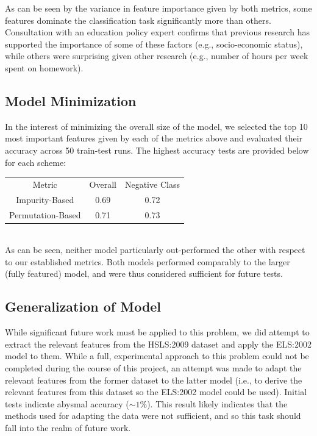 \documentclass[conference]{IEEEtran}
\begin{document}
As can be seen by the variance in feature importance given by both metrics, some features dominate the classification task significantly more than others. Consultation with an education policy expert confirms that previous research has supported the importance of some of these factors (e.g., socio-economic status), while others were surprising given other research (e.g., number of hours per week spent on homework).\\

\subsection{Model Minimization}

In the interest of minimizing the overall size of the model, we selected the top 10 most important features given by each of the metrics above and evaluated their accuracy across 50 train-test runs. The highest accuracy tests are provided below for each scheme:\\

\begin{tabular}{| c | c | c |}
\hline
Metric & Overall & Negative Class\\
Impurity-Based & 0.69 & 0.72\\
Permutation-Based & 0.71 & 0.73\\
\hline
\end{tabular}

$\;$\\
As can be seen, neither model particularly out-performed the other with respect to our established metrics. Both models performed comparably to the larger (fully featured) model, and were thus considered sufficient for future tests.\\

\subsection{Generalization of Model}

While significant future work must be applied to this problem, we did attempt to extract the relevant features from the HSLS:2009 dataset and apply the ELS:2002 model to them. While a full, experimental approach to this problem could not be completed during the course of this project, an attempt was made to adapt the relevant features from the former dataset to the latter model (i.e., to derive the relevant features from this dataset so the ELS:2002 model could be used). Initial tests indicate abysmal accuracy ($\sim1\%$). This result likely indicates that the methods used for adapting the data were not sufficient, and so this task should fall into the realm of future work.\\
\end{document}
